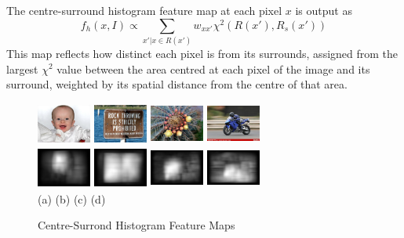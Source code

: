 \documentclass[10pt,twocolumn,letterpaper]{article}
\newcommand{\SUM}{\sum\limits}
\newcommand{\hs}{\hspace{0.58in}}
\begin{document}
The centre-surround histogram feature map at each pixel $x$ is output as $$f_h(x,I)\propto\SUM_{x'|x\in R(x')}w_{xx'}\chi^2(R(x'),R_s(x'))$$
This map reflects how distinct each pixel is from its surrounds, assigned from the largest $\chi^2$ value between the area centred at each pixel of the image and its surround, weighted by its spatial distance from the centre of that area. 

\begin{figure}[b]
    \begin{center}
    \includegraphics[width=0.7in,height=0.54in]{./Figures/CSH_image/1orig.jpg}
    \includegraphics[width=0.7in,height=0.54in]{./Figures/CSH_image/2orig.jpg}
    \includegraphics[width=0.7in,height=0.54in]{./Figures/CSH_image/3orig.jpg}
    \includegraphics[width=0.7in,height=0.54in]{./Figures/CSH_image/4orig.jpg}\\
    \includegraphics[width=0.7in,height=0.54in]{./Figures/CSH_image/1cont.jpg}
    \includegraphics[width=0.7in,height=0.54in]{./Figures/CSH_image/2cont.jpg}
    \includegraphics[width=0.7in,height=0.54in]{./Figures/CSH_image/3cont.jpg}
    \includegraphics[width=0.7in,height=0.54in]{./Figures/CSH_image/4cont.jpg}\\
    \footnotesize \hspace{0.1cm} (a) \hs (b) \hs  (c) \hs (d) \\
    \caption{Centre-Surrond Histogram Feature Maps} \label{Fig:RegionalFeatureMap}
    \end{center}
\end{figure}
\end{document}
